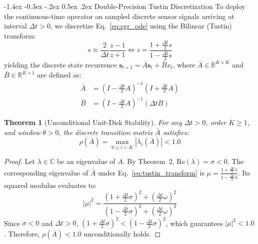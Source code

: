 \documentclass[10pt,twocolumn,a4paper]{article}
\makeatletter
\renewcommand\subsection{\@startsection{subsection}{2}{\z@}%
  {-1.4ex \@plus -0.3ex \@minus -.2ex}%
  {0.5ex \@plus .2ex}%
  {\normalfont\normalsize\bfseries}}
\theoremstyle{plain}
\newtheorem{theorem}{Theorem}
\theoremstyle{definition}
\makeatother
\begin{document}
\subsection{Double-Precision Tustin Discretization}
To deploy the continuous-time operator on sampled discrete sensor signals arriving at interval $\Delta t > 0$, we discretize Eq.~\eqref{eq:cgr_ode} using the Bilinear (Tustin) transform:
\begin{equation}
s \approx \frac{2}{\Delta t} \frac{z - 1}{z + 1} \iff z = \frac{1 + \frac{\Delta t}{2} s}{1 - \frac{\Delta t}{2} s}
\label{eq:tustin_transform}
\end{equation}
yielding the discrete state recurrence $\mathbf{s}_{t+1} = \bar{A} \mathbf{s}_t + \bar{B} x_t$, where $\bar{A} \in \mathbb{R}^{K \times K}$ and $\bar{B} \in \mathbb{R}^{K \times 1}$ are defined as:
\begin{align}
\bar{A} &= \left( I - \frac{\Delta t}{2} A \right)^{-1} \left( I + \frac{\Delta t}{2} A \right) \label{eq:A_bar} \\
\bar{B} &= \left( I - \frac{\Delta t}{2} A \right)^{-1} (\Delta t B) \label{eq:B_bar}
\end{align}

\begin{theorem}[Unconditional Unit-Disk Stability]
For any $\Delta t > 0$, order $K \ge 1$, and window $\theta > 0$, the discrete transition matrix $\bar{A}$ satisfies:
\begin{equation}
\rho(\bar{A}) = \max_{0 \le i < K} |\lambda_i(\bar{A})| < 1.0
\end{equation}
\end{theorem}
\begin{proof}
Let $\lambda \in \mathbb{C}$ be an eigenvalue of $A$. By Theorem~2, $\mathrm{Re}(\lambda) = \sigma < 0$. The corresponding eigenvalue of $\bar{A}$ under Eq.~\eqref{eq:tustin_transform} is $\mu = \frac{1 + \frac{\Delta t}{2} \lambda}{1 - \frac{\Delta t}{2} \lambda}$. Its squared modulus evaluates to:
\begin{equation*}
|\mu|^2 = \frac{\left( 1 + \frac{\Delta t}{2} \sigma \right)^2 + \left( \frac{\Delta t}{2} \omega \right)^2}{\left( 1 - \frac{\Delta t}{2} \sigma \right)^2 + \left( \frac{\Delta t}{2} \omega \right)^2}
\end{equation*}
Since $\sigma < 0$ and $\Delta t > 0$, $(1 + \frac{\Delta t}{2} \sigma)^2 < (1 - \frac{\Delta t}{2} \sigma)^2$, which guarantees $|\mu|^2 < 1.0$. Therefore, $\rho(\bar{A}) < 1.0$ unconditionally holds.
\end{proof}
\end{document}
